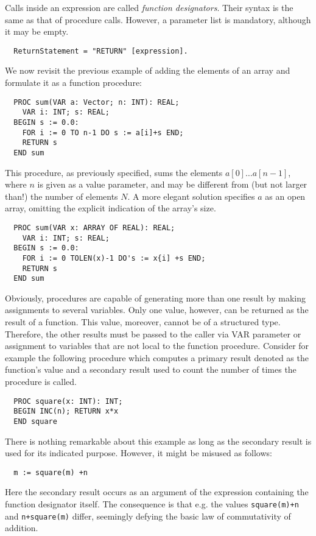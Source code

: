 Calls inside an expression are called \emph{function designators}. Their syntax is the same
as that of procedure calls. However, a parameter list is mandatory, although it may be empty.
\begin{verbatim}
  ReturnStatement = "RETURN" [expression].
\end{verbatim}
We now revisit the previous example of adding the elements of an array and formulate it as
a function procedure:
\begin{verbatim}
  PROC sum(VAR a: Vector; n: INT): REAL;
    VAR i: INT; s: REAL;
  BEGIN s := 0.0:
    FOR i := 0 TO n-1 DO s := a[i]+s END;
    RETURN s
  END sum
\end{verbatim}
This procedure, as previously specified, sums the elements $a[0] \dots a[n-1]$, where $n$
is given as a value parameter, and may be different from (but not larger than!) the number
of elements $N$. A more elegant solution specifies $a$ as an open array, omitting the
explicit indication of the array's size.
\begin{verbatim}
  PROC sum(VAR x: ARRAY OF REAL): REAL;
    VAR i: INT; s: REAL;
  BEGIN s := 0.0:
    FOR i := 0 TOLEN(x)-1 DO's := x{i] +s END;
    RETURN s
  END sum
\end{verbatim}
Obviously, procedures are capable of generating more than one result by making assignments
to several variables. Only one value, however, can be returned as the result of a function.
This value, moreover, cannot be of a structured type. Therefore, the other results must be
passed to the caller via VAR parameter or assignment to variables that are not local to the
function procedure. Consider for example the following procedure which computes a primary
result denoted as the function's value and a secondary result used to count the number of
times the procedure is called.
\begin{verbatim}
  PROC square(x: INT): INT;
  BEGIN INC(n); RETURN x*x
  END square
\end{verbatim}
There is nothing remarkable about this example as long as the secondary result is used for
its indicated purpose. However, it might be misused as follows:
\begin{verbatim}
  m := square(m) +n
\end{verbatim}
Here the secondary result occurs as an argument of the expression containing the function
designator itself. The consequence is that e.g. the values \verb|square(m)+n| and
\verb|n+square(m)| differ, seemingly defying the basic law of commutativity of addition.

